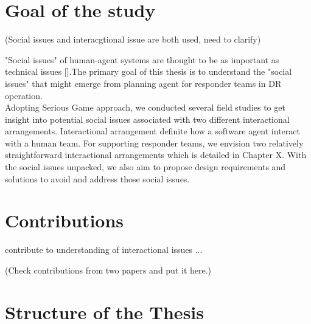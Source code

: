 \section{Goal of the study}\label{sec:custom}
(Social issues and interacgtional issue are both used, need to clarify)

"Social issues" of human-agent systems are thought to be as important as technical issues [].The primary goal of this thesis is to understand the "social issues" that might emerge from  planning agent for responder teams in DR operation. \\

Adopting Serious Game approach, we conducted several field studies to get insight into potential social issues associated with two different interactional arrangements. Interactional arrangement definite how a software agent interact with a human team. For supporting responder teams, we envision two relatively straightforward interactional arrangements which is detailed in Chapter X. With the social issues unpacked, we also aim to propose design requirements and solutions to avoid and address those social issues.\\

\section{Contributions}\label{sec:custom}

contribute to understanding of interactional issues ...

(Check contributions from two papers and put it here.)

\section{Structure of the Thesis}\label{sec:issues}







